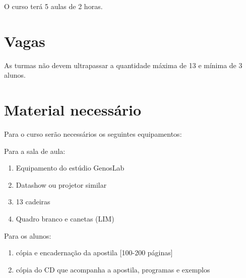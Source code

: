\documentclass[12pt,brazil]{article}
\begin{document}
O curso terá 5 aulas de 2 horas.
 
\section{Vagas}
As turmas não devem ultrapassar a quantidade máxima de 13 e mínima de 3
alunos.

\section{Material necessário}
\label{sec:material}

Para o curso serão necessários os seguintes equipamentos:

Para a sala de aula:
\begin{enumerate}
\item Equipamento do estúdio GenosLab
\item Datashow ou projetor similar
\item 13 cadeiras
\item Quadro branco e canetas (LIM)
\end{enumerate}

Para os alunos:

\begin{enumerate}
\item cópia e encadernação da apostila [100-200 páginas]
\item cópia do CD que acompanha a apostila, programas e exemplos
\end{enumerate}
\end{document}
